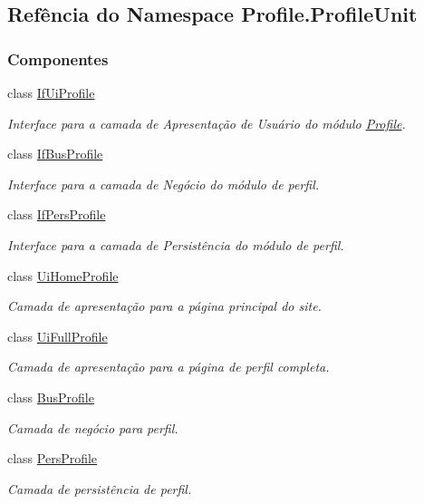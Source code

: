 \hypertarget{namespaceProfile_1_1ProfileUnit}{\subsection{Refência do Namespace Profile.\-Profile\-Unit}
\label{namespaceProfile_1_1ProfileUnit}
}
\subsubsection*{Componentes}
\begin{DoxyCompactItemize}
\item 
class \hyperlink{classProfile_1_1ProfileUnit_1_1IfUiProfile}{If\-Ui\-Profile}
\begin{DoxyCompactList}\small\item\em Interface para a camada de Apresentação de Usuário do módulo \hyperlink{namespaceProfile}{Profile}. \end{DoxyCompactList}\item 
class \hyperlink{classProfile_1_1ProfileUnit_1_1IfBusProfile}{If\-Bus\-Profile}
\begin{DoxyCompactList}\small\item\em Interface para a camada de Negócio do módulo de perfil. \end{DoxyCompactList}\item 
class \hyperlink{classProfile_1_1ProfileUnit_1_1IfPersProfile}{If\-Pers\-Profile}
\begin{DoxyCompactList}\small\item\em Interface para a camada de Persistência do módulo de perfil. \end{DoxyCompactList}\item 
class \hyperlink{classProfile_1_1ProfileUnit_1_1UiHomeProfile}{Ui\-Home\-Profile}
\begin{DoxyCompactList}\small\item\em Camada de apresentação para a página principal do site. \end{DoxyCompactList}\item 
class \hyperlink{classProfile_1_1ProfileUnit_1_1UiFullProfile}{Ui\-Full\-Profile}
\begin{DoxyCompactList}\small\item\em Camada de apresentação para a página de perfil completa. \end{DoxyCompactList}\item 
class \hyperlink{classProfile_1_1ProfileUnit_1_1BusProfile}{Bus\-Profile}
\begin{DoxyCompactList}\small\item\em Camada de negócio para perfil. \end{DoxyCompactList}\item 
class \hyperlink{classProfile_1_1ProfileUnit_1_1PersProfile}{Pers\-Profile}
\begin{DoxyCompactList}\small\item\em Camada de persistência de perfil. \end{DoxyCompactList}\end{DoxyCompactItemize}
